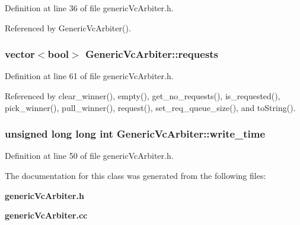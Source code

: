 Definition at line 36 of file genericVcArbiter.h.

Referenced by GenericVcArbiter().
\subsubsection[{requests}]{\setlength{\rightskip}{0pt plus 5cm}vector$<$bool$>$ {\bf GenericVcArbiter::requests}\hspace{0.3cm}{\tt  [private]}}\label{classGenericVcArbiter_dd5c93221687ab6778e467366f75e845}




Definition at line 61 of file genericVcArbiter.h.

Referenced by clear\_\-winner(), empty(), get\_\-no\_\-requests(), is\_\-requested(), pick\_\-winner(), pull\_\-winner(), request(), set\_\-req\_\-queue\_\-size(), and toString().
\subsubsection[{write\_\-time}]{\setlength{\rightskip}{0pt plus 5cm}unsigned long long int {\bf GenericVcArbiter::write\_\-time}}\label{classGenericVcArbiter_92c6b36810e3ca21255596f2fde60a96}




Definition at line 50 of file genericVcArbiter.h.

The documentation for this class was generated from the following files:\begin{CompactItemize}
\item 
{\bf genericVcArbiter.h}\item 
{\bf genericVcArbiter.cc}\end{CompactItemize}
